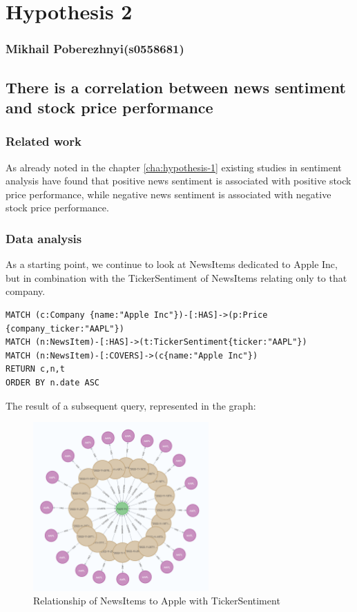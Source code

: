 \newpage
\section{Hypothesis 2}
\subsubsection*{Mikhail Poberezhnyi(s0558681)}
\label{cha:hypothesis-2}
\subsection{There is a correlation between news sentiment and stock price performance}
\subsubsection{Related work}
As already noted in the chapter \ref{cha:hypothesis-1}
existing studies in sentiment analysis have found that positive news sentiment is associated with positive stock price performance, while negative news sentiment is associated with negative stock price performance.\cite{kalyani2016stock}
\subsubsection{Data analysis}
As a starting point, we continue to look at NewsItems dedicated to Apple Inc, but in combination with the TickerSentiment of NewsItems relating only to that company. 
\begin{lstlisting}[caption={Relationship of NewsItems to Apple Stock with TickerSentiment}, label={lst:newsItems_tickerSentiment_apple},captionpos=b]
MATCH (c:Company {name:"Apple Inc"})-[:HAS]->(p:Price {company_ticker:"AAPL"})
MATCH (n:NewsItem)-[:HAS]->(t:TickerSentiment{ticker:"AAPL"})
MATCH (n:NewsItem)-[:COVERS]->(c{name:"Apple Inc"})
RETURN c,n,t
ORDER BY n.date ASC
\end{lstlisting}

The result of a subsequent query, represented in the graph:
\begin{figure}[h]
 \centering
 \includegraphics[width=0.6\textwidth]{images/apple_news_ticker_sentiment_graph.png}
 \caption{Relationship of NewsItems to Apple with TickerSentiment }
 \label{fig:apple_news_ticker_sentiment_graph}
\end{figure}

